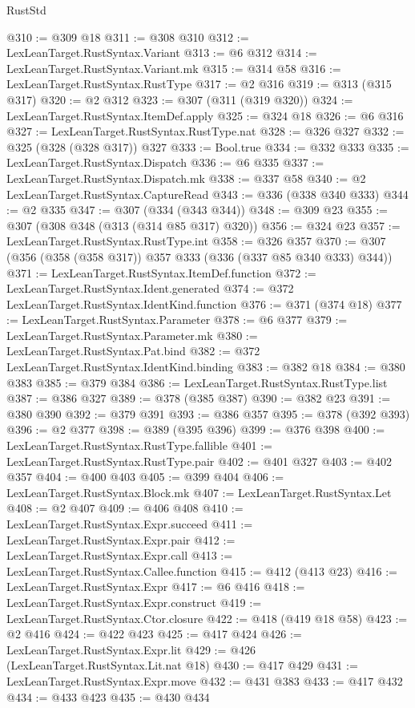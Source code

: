\begin{lexlean}{RustStd}
\begin{coremodule}
@310 := @309 @18
@311 := @308 @310
@312 := LexLeanTarget.RustSyntax.Variant
@313 := @6 @312
@314 := LexLeanTarget.RustSyntax.Variant.mk
@315 := @314 @58
@316 := LexLeanTarget.RustSyntax.RustType
@317 := @2 @316
@319 := @313 (@315 @317)
@320 := @2 @312
@323 := @307 (@311 (@319 @320))
@324 := LexLeanTarget.RustSyntax.ItemDef.apply
@325 := @324 @18
@326 := @6 @316
@327 := LexLeanTarget.RustSyntax.RustType.nat
@328 := @326 @327
@332 := @325 (@328 (@328 @317)) @327
@333 := Bool.true
@334 := @332 @333
@335 := LexLeanTarget.RustSyntax.Dispatch
@336 := @6 @335
@337 := LexLeanTarget.RustSyntax.Dispatch.mk
@338 := @337 @58
@340 := @2 LexLeanTarget.RustSyntax.CaptureRead
@343 := @336 (@338 @340 @333)
@344 := @2 @335
@347 := @307 (@334 (@343 @344))
@348 := @309 @23
@355 := @307 (@308 @348 (@313 (@314 @85 @317) @320))
@356 := @324 @23
@357 := LexLeanTarget.RustSyntax.RustType.int
@358 := @326 @357
@370 := @307 (@356 (@358 (@358 @317)) @357 @333 (@336 (@337 @85 @340 @333) @344))
@371 := LexLeanTarget.RustSyntax.ItemDef.function
@372 := LexLeanTarget.RustSyntax.Ident.generated
@374 := @372 LexLeanTarget.RustSyntax.IdentKind.function
@376 := @371 (@374 @18)
@377 := LexLeanTarget.RustSyntax.Parameter
@378 := @6 @377
@379 := LexLeanTarget.RustSyntax.Parameter.mk
@380 := LexLeanTarget.RustSyntax.Pat.bind
@382 := @372 LexLeanTarget.RustSyntax.IdentKind.binding
@383 := @382 @18
@384 := @380 @383
@385 := @379 @384
@386 := LexLeanTarget.RustSyntax.RustType.list
@387 := @386 @327
@389 := @378 (@385 @387)
@390 := @382 @23
@391 := @380 @390
@392 := @379 @391
@393 := @386 @357
@395 := @378 (@392 @393)
@396 := @2 @377
@398 := @389 (@395 @396)
@399 := @376 @398
@400 := LexLeanTarget.RustSyntax.RustType.fallible
@401 := LexLeanTarget.RustSyntax.RustType.pair
@402 := @401 @327
@403 := @402 @357
@404 := @400 @403
@405 := @399 @404
@406 := LexLeanTarget.RustSyntax.Block.mk
@407 := LexLeanTarget.RustSyntax.Let
@408 := @2 @407
@409 := @406 @408
@410 := LexLeanTarget.RustSyntax.Expr.succeed
@411 := LexLeanTarget.RustSyntax.Expr.pair
@412 := LexLeanTarget.RustSyntax.Expr.call
@413 := LexLeanTarget.RustSyntax.Callee.function
@415 := @412 (@413 @23)
@416 := LexLeanTarget.RustSyntax.Expr
@417 := @6 @416
@418 := LexLeanTarget.RustSyntax.Expr.construct
@419 := LexLeanTarget.RustSyntax.Ctor.closure
@422 := @418 (@419 @18 @58)
@423 := @2 @416
@424 := @422 @423
@425 := @417 @424
@426 := LexLeanTarget.RustSyntax.Expr.lit
@429 := @426 (LexLeanTarget.RustSyntax.Lit.nat @18)
@430 := @417 @429
@431 := LexLeanTarget.RustSyntax.Expr.move
@432 := @431 @383
@433 := @417 @432
@434 := @433 @423
@435 := @430 @434

\end{coremodule}
\end{lexlean}

